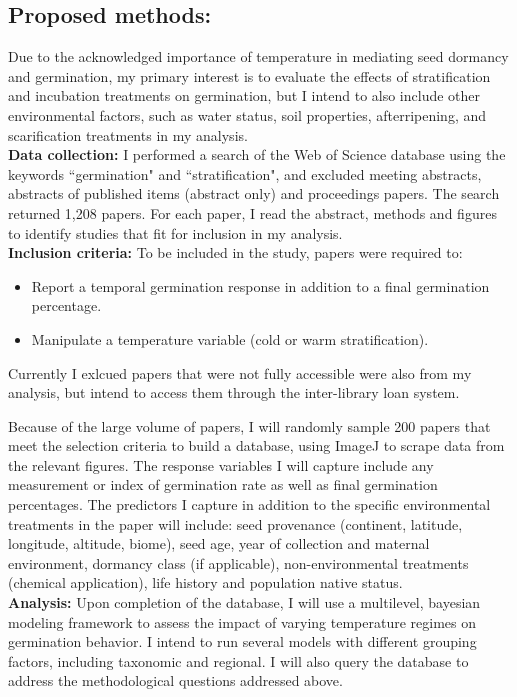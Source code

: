 \documentclass{article}\usepackage[]{graphicx}\usepackage[]{color}
\begin{document}
\subsection*{Proposed methods:}
\indent\indent Due to the acknowledged importance of temperature in mediating seed dormancy and germination, my primary interest is to evaluate the effects of stratification and incubation treatments on germination, but I intend to also include other environmental factors, such as water status, soil properties, afterripening, and scarification treatments in my analysis.\\
\indent\textbf{Data collection:} I performed a search of the Web of Science database using the keywords ``germination" and ``stratification", and excluded meeting abstracts, abstracts of published items (abstract only) and proceedings papers. The search returned 1,208 papers. For each paper, I read the abstract, methods and figures to identify studies that fit for inclusion in my analysis.\\
\indent\textbf{Inclusion criteria:} To be included in the study, papers were required to:
\begin{itemize}
\item Report a temporal germination response in addition to a final germination percentage.
\item Manipulate a temperature variable (cold or warm stratification).
\end{itemize}
Currently I exlcued papers that were not fully accessible were also from my analysis, but intend to access them through the inter-library loan system. 
\par Because of the large volume of papers, I will randomly sample 200 papers that meet the selection criteria to build a database, using ImageJ to scrape data from the relevant figures. The response variables I will capture include any measurement or index of germination rate as well as final germination percentages. The predictors I capture in addition to the specific environmental treatments in the paper will include: seed provenance (continent, latitude, longitude, altitude, biome), seed age, year of collection and maternal environment, dormancy class (if applicable), non-environmental treatments (chemical application), life history and population native status.\\
\indent\indent\textbf{Analysis:} Upon completion of the database, I will use a multilevel, bayesian modeling framework to assess the impact of varying temperature regimes on germination behavior. I intend to run several models with different grouping factors, including taxonomic and regional. I will also query the database to address the methodological questions addressed above.
\end{document}

